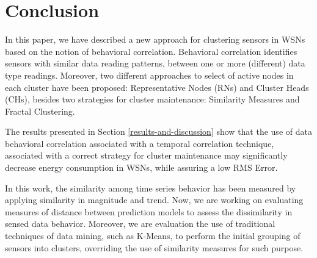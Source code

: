 \documentclass[conference]{IEEEtran}
\begin{document}
\section{Conclusion}
\label{conclusion}

In this paper, we have described a new approach for clustering sensors in WSNs
based on the notion of behavioral correlation. Behavioral correlation identifies
sensors with similar data reading patterns, between one or more (different) data
type readings. Moreover, two different approaches to select of active nodes in
each cluster have been proposed: Representative Nodes (RNs) and Cluster Heads
(CHs), besides two strategies for cluster maintenance: Similarity
Measures and Fractal Clustering.

The results presented in Section \ref{results-and-discussion} show that the use
of data behavioral correlation associated with a temporal correlation technique,
associated with a correct strategy for cluster maintenance may significantly
decrease energy consumption in WSNs, while assuring a low RMS Error.

In this work, the similarity among time series behavior has been measured by
applying similarity in magnitude and trend. Now, we are working on evaluating
measures of distance between prediction models to assess the dissimilarity in
sensed data behavior. Moreover, we are evaluation the use of traditional
techniques of data mining, such as K-Means, to perform the initial grouping of
sensors into clusters, overriding the use of similarity measures for such
purpose.






  
\end{document}
